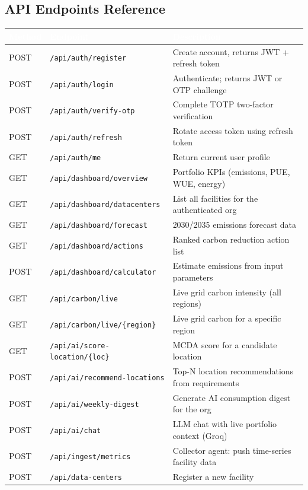 \documentclass[11pt, a4paper]{article}
\newcommand{\tableheader}[1]{\cellcolor{flaergreen!90}\textcolor{white}{\textbf{\small #1}}}
\begin{document}
\subsection{API Endpoints Reference}

\begin{tabular}{p{1.5cm} p{5.5cm} p{6.8cm}}
  \toprule
  \tableheader{Method} & \tableheader{Endpoint} & \tableheader{Description} \\
  \midrule
  POST & \texttt{/api/auth/register}        & Create account, returns JWT + refresh token \\
  \rowcolor{rowalt} POST & \texttt{/api/auth/login}            & Authenticate; returns JWT or OTP challenge \\
  POST & \texttt{/api/auth/verify-otp}       & Complete TOTP two-factor verification \\
  \rowcolor{rowalt} POST & \texttt{/api/auth/refresh}          & Rotate access token using refresh token \\
  GET  & \texttt{/api/auth/me}               & Return current user profile \\
  \rowcolor{rowalt} GET  & \texttt{/api/dashboard/overview}    & Portfolio KPIs (emissions, PUE, WUE, energy) \\
  GET  & \texttt{/api/dashboard/datacenters} & List all facilities for the authenticated org \\
  \rowcolor{rowalt} GET  & \texttt{/api/dashboard/forecast}    & 2030/2035 emissions forecast data \\
  GET  & \texttt{/api/dashboard/actions}     & Ranked carbon reduction action list \\
  \rowcolor{rowalt} POST & \texttt{/api/dashboard/calculator}  & Estimate emissions from input parameters \\
  GET  & \texttt{/api/carbon/live}           & Live grid carbon intensity (all regions) \\
  \rowcolor{rowalt} GET  & \texttt{/api/carbon/live/\{region\}}& Live grid carbon for a specific region \\
  GET  & \texttt{/api/ai/score-location/\{loc\}} & MCDA score for a candidate location \\
  \rowcolor{rowalt} POST & \texttt{/api/ai/recommend-locations}& Top-N location recommendations from requirements \\
  POST & \texttt{/api/ai/weekly-digest}      & Generate AI consumption digest for the org \\
  \rowcolor{rowalt} POST & \texttt{/api/ai/chat}               & LLM chat with live portfolio context (Groq) \\
  POST & \texttt{/api/ingest/metrics}        & Collector agent: push time-series facility data \\
  \rowcolor{rowalt} POST & \texttt{/api/data-centers}          & Register a new facility \\
  \bottomrule
\end{tabular}
\end{document}
